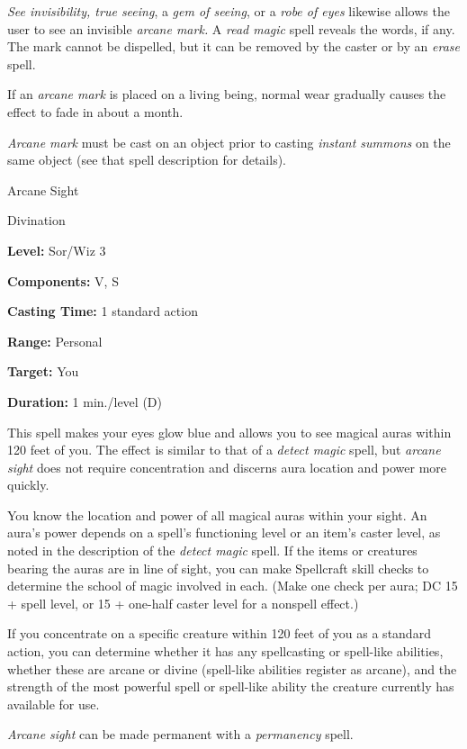 \documentclass{article}
\begin{document}
\textit{See invisibility, true seeing}, a \textit{gem of seeing}, or a \textit{robe 
of eyes }likewise allows the user to see an invisible \textit{arcane mark. }A \textit{read 
magic }spell reveals the words, if any. The mark cannot be dispelled, but it can 
be removed by the caster or by an \textit{erase }spell.

If an \textit{arcane mark }is placed on a living being, normal wear gradually causes 
the effect to fade in about a month.

\textit{Arcane mark }must be cast on an object prior to casting \textit{instant 
summons }on the same object (see that spell description for details).

\vspace{12pt}
Arcane Sight

Divination

\textbf{Level:} Sor/Wiz 3

\textbf{Components:} V, S

\textbf{Casting Time:} 1 standard action

\textbf{Range:} Personal

\textbf{Target:} You

\textbf{Duration:} 1 min./level (D)

This spell makes your eyes glow blue and allows you to see magical auras within 
120 feet of you. The effect is similar to that of a \textit{detect magic }spell, 
but \textit{arcane sight }does not require concentration and discerns aura location 
and power more quickly.

You know the location and power of all magical auras within your sight. An aura's 
power depends on a spell's functioning level or an item's caster level, as noted 
in the description of the \textit{detect magic }spell. If the items or creatures 
bearing the auras are in line of sight, you can make Spellcraft skill checks to 
determine the school of magic involved in each. (Make one check per aura; DC 15 
+ spell level, or 15 + one-half caster level for a nonspell effect.)

If you concentrate on a specific creature within 120 feet of you as a standard 
action, you can determine whether it has any spellcasting or spell-like abilities, 
whether these are arcane or divine (spell-like abilities register as arcane), and 
the strength of the most powerful spell or spell-like ability the creature currently 
has available for use.

\textit{Arcane sight }can be made permanent with a \textit{permanency }spell.
\end{document}
